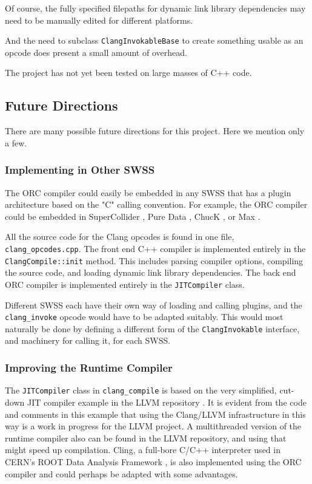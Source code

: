 \documentclass[letterpaper, 12pt]{article}
\begin{document}
Of course, the fully specified filepaths for dynamic link library dependencies may need to be manually edited for different platforms.

And the need to subclass \verb|ClangInvokableBase| to create something usable as an opcode does present a small amount of overhead.

The project has not yet been tested on large masses of C++ code.

\subsection{Future Directions}

There are many possible future directions for this project. Here we mention only a few.

\subsubsection{Implementing in Other SWSS}

The ORC compiler could easily be embedded in any SWSS that has a plugin architecture based on the "C" calling convention. For example, the ORC compiler could be embedded in SuperCollider \citep{supercollider}, Pure Data \citep{pd}, ChucK \citep{chuck, chuckcmj}, or Max \citep{max}. 

All the source code for the Clang opcodes is found in one file, \verb|clang_opcodes.cpp|. The front end C++ compiler is implemented entirely in the \verb|ClangCompile::init| method. This includes parsing compiler options, compiling the source code, and loading dynamic link library dependencies. The back end ORC compiler is implemented entirely in the \verb|JITCompiler| class. 

Different SWSS each have their own way of loading and calling plugins, and the \verb|clang_invoke| opcode would have to be adapted suitably. This would most naturally be done by defining a different form of the \verb|ClangInvokable| interface, and machinery for calling it, for each SWSS.

\subsubsection{Improving the Runtime Compiler}

The \verb|JITCompiler| class in \verb|clang_compile| is based on the very simplified, cut-down JIT compiler example in the LLVM repository \citep{clanginterpreter}. It is evident from the code and comments in this example that using the Clang/LLVM infrastructure in this way is a work in progress for the LLVM project. A multithreaded version of the runtime compiler also can be found in the LLVM repository, and using that might speed up compilation. Cling, a full-bore C/C++ interpreter \citep{vasilev2012cling, clingrepo} used in CERN's ROOT Data Analysis Framework \citep{ROOT}, is also implemented using the ORC compiler and could perhaps be adapted with some advantages.
\end{document}
